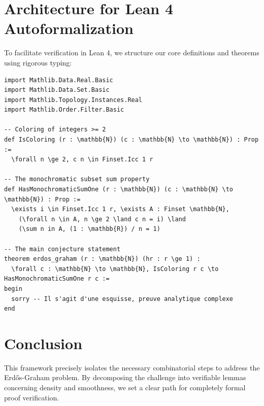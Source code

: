 \documentclass[12pt,a4paper]{article}
\begin{document}
\section{Architecture for Lean 4 Autoformalization}
To facilitate verification in Lean 4, we structure our core definitions and theorems using rigorous typing:

\begin{verbatim}
import Mathlib.Data.Real.Basic
import Mathlib.Data.Set.Basic
import Mathlib.Topology.Instances.Real
import Mathlib.Order.Filter.Basic

-- Coloring of integers >= 2
def IsColoring (r : \mathbb{N}) (c : \mathbb{N} \to \mathbb{N}) : Prop :=
  \forall n \ge 2, c n \in Finset.Icc 1 r

-- The monochromatic subset sum property
def HasMonochromaticSumOne (r : \mathbb{N}) (c : \mathbb{N} \to \mathbb{N}) : Prop :=
  \exists i \in Finset.Icc 1 r, \exists A : Finset \mathbb{N},
    (\forall n \in A, n \ge 2 \land c n = i) \land
    (\sum n in A, (1 : \mathbb{R}) / n = 1)

-- The main conjecture statement
theorem erdos_graham (r : \mathbb{N}) (hr : r \ge 1) :
  \forall c : \mathbb{N} \to \mathbb{N}, IsColoring r c \to HasMonochromaticSumOne r c :=
begin
  sorry -- Il s'agit d'une esquisse, preuve analytique complexe
end
\end{verbatim}

\section{Conclusion}
This framework precisely isolates the necessary combinatorial steps to address the Erd\H{o}s-Graham problem. By decomposing the challenge into verifiable lemmas concerning density and smoothness, we set a clear path for completely formal proof verification.
\end{document}
